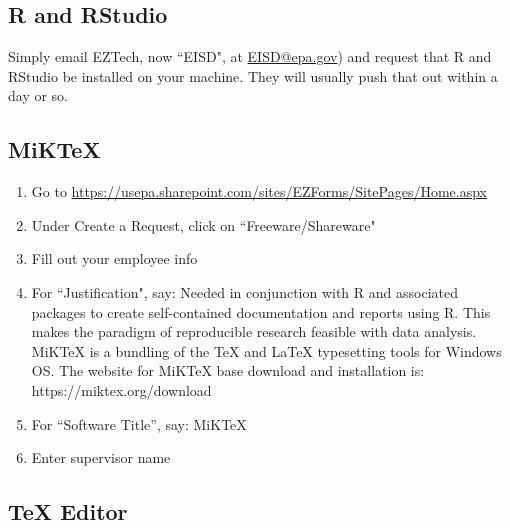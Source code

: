 \documentclass{article}
\begin{document}
\subsection{R and RStudio}
Simply email EZTech, now ``EISD", at \href{mailto:EISD@epa.gov}{EISD@epa.gov}) and request that R and RStudio be installed on your machine. They will usually push that out within a day or so.

\subsection{MiKTeX}
\begin{enumerate}
    \item Go to \url{https://usepa.sharepoint.com/sites/EZForms/SitePages/Home.aspx}
    \item Under Create a Request, click on ``Freeware/Shareware"
    \item Fill out your employee info
    \item For ``Justification", say: Needed in conjunction with R and associated packages to create self-contained documentation and reports using R. This makes the paradigm of reproducible research feasible with data analysis. MiKTeX is a bundling of the TeX and LaTeX typesetting tools for Windows OS. The website for MiKTeX base download and installation is: https://miktex.org/download
    \item For “Software Title”, say: MiKTeX
    \item Enter supervisor name
\end{enumerate}

\subsection{TeX Editor}
\end{document}

